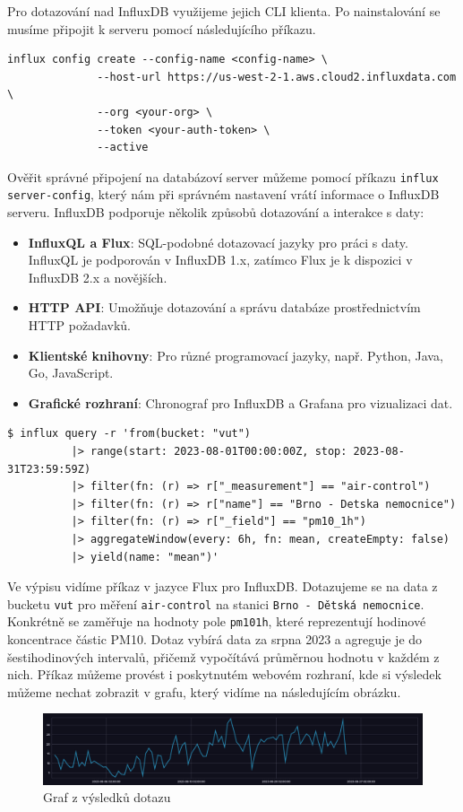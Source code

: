\documentclass[a4paper, 11pt]{article}
\begin{document}
        Pro dotazování nad InfluxDB využijeme jejich CLI klienta. Po nainstalování se musíme připojit k serveru pomocí následujícího příkazu.
        \begin{lstlisting}[style=Python]
            influx config create --config-name <config-name> \
              --host-url https://us-west-2-1.aws.cloud2.influxdata.com \
              --org <your-org> \
              --token <your-auth-token> \
              --active
        \end{lstlisting}
        Ověřit správné připojení na databázoví server můžeme pomocí příkazu \texttt{influx server-config}, který nám při správném nastavení vrátí informace o InfluxDB serveru. InfluxDB podporuje několik způsobů dotazování a interakce s daty:

        \begin{itemize}
            \item \textbf{InfluxQL a Flux}: SQL-podobné dotazovací jazyky pro práci s daty. InfluxQL je podporován v InfluxDB 1.x, zatímco Flux je k dispozici v InfluxDB 2.x a novějších.
            \item \textbf{HTTP API}: Umožňuje dotazování a správu databáze prostřednictvím HTTP požadavků.
            \item \textbf{Klientské knihovny}: Pro různé programovací jazyky, např. Python, Java, Go, JavaScript.
            \item \textbf{Grafické rozhraní}: Chronograf pro InfluxDB a Grafana pro vizualizaci dat.
        \end{itemize}
        \begin{lstlisting}[style=Python]
         $ influx query -r 'from(bucket: "vut")
          |> range(start: 2023-08-01T00:00:00Z, stop: 2023-08-31T23:59:59Z)
          |> filter(fn: (r) => r["_measurement"] == "air-control")
          |> filter(fn: (r) => r["name"] == "Brno - Detska nemocnice")
          |> filter(fn: (r) => r["_field"] == "pm10_1h")
          |> aggregateWindow(every: 6h, fn: mean, createEmpty: false)
          |> yield(name: "mean")'
        \end{lstlisting}
        Ve výpisu vidíme příkaz v jazyce Flux pro InfluxDB. Dotazujeme se na data z bucketu \texttt{vut} pro měření \texttt{air-control} na stanici \texttt{Brno - Dětská nemocnice}. Konkrétně se zaměřuje na hodnoty pole \texttt{pm10\textunderscore1h}, které reprezentují hodinové koncentrace částic PM10. Dotaz vybírá data za srpna 2023 a agreguje je do šestihodinových intervalů, přičemž vypočítává průměrnou hodnotu v každém z nich. Příkaz můžeme provést i poskytnutém webovém rozhraní, kde si výsledek můžeme nechat zobrazit v grafu, který vidíme na následujícím obrázku.
        \begin{figure}[ht!]
        \centering
        \includegraphics[width=1\textwidth]{img/inflexGraf.png}
        \caption{Graf z výsledků dotazu \label{InfluxGraf}}
    \end{figure}

    
    
\end{document}
